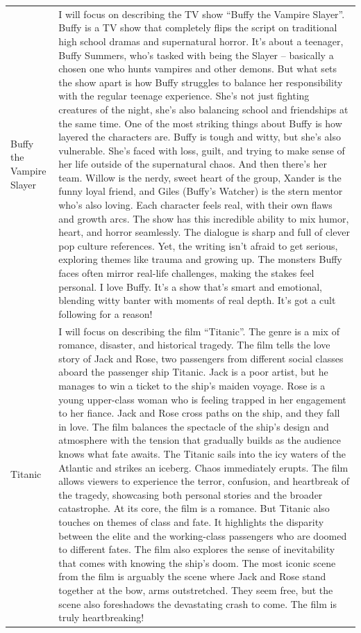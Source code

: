 \documentclass[
  man,
  floatsintext,
  longtable,
  nolmodern,
  notxfonts,
  notimes,
  colorlinks=true,linkcolor=blue,citecolor=blue,urlcolor=blue]{apa7}
\begin{document}
\begin{supptbl}[H]
\begin{minipage}{\linewidth}
\begin{tabular}{>{\raggedright\arraybackslash}p{2cm}>{\raggedright\arraybackslash}p{14cm}}
Buffy the Vampire Slayer & I will focus on describing the TV show “Buffy the Vampire Slayer”. Buffy is a TV show that completely flips the script on traditional high school dramas and supernatural horror. It's about a teenager, Buffy Summers, who's tasked with being the Slayer – basically a chosen one who hunts vampires and other demons. But what sets the show apart is how Buffy struggles to balance her responsibility with the regular teenage experience. She's not just fighting creatures of the night, she's also balancing school and friendships at the same time. One of the most striking things about Buffy is how layered the characters are. Buffy is tough and witty, but she's also vulnerable. She's faced with loss, guilt, and trying to make sense of her life outside of the supernatural chaos. And then there's her team. Willow is the nerdy, sweet heart of the group, Xander is the funny loyal friend, and Giles (Buffy's Watcher) is the stern mentor who's also loving. Each character feels real, with their own flaws and growth arcs. The show has this incredible ability to mix humor, heart, and horror seamlessly. The dialogue is sharp and full of clever pop culture references. Yet, the writing isn't afraid to get serious, exploring themes like trauma and growing up. The monsters Buffy faces often mirror real-life challenges, making the stakes feel personal. I love Buffy. It's a show that's smart and emotional, blending witty banter with moments of real depth. It's got a cult following for a reason!\\
Titanic & I will focus on describing the film “Titanic”. The genre is a mix of romance, disaster, and historical tragedy. The film tells the love story of Jack and Rose, two passengers from different social classes aboard the passenger ship Titanic. Jack is a poor artist, but he manages to win a ticket to the ship's maiden voyage. Rose is a young upper-class woman who is feeling trapped in her engagement to her fiance. Jack and Rose cross paths on the ship, and they fall in love. The film balances the spectacle of the ship's design and atmosphere with the tension that gradually builds as the audience knows what fate awaits. The Titanic sails into the icy waters of the Atlantic and strikes an iceberg. Chaos immediately erupts. The film allows viewers to experience the terror, confusion, and heartbreak of the tragedy, showcasing both personal stories and the broader catastrophe. At its core, the film is a romance. But Titanic also touches on themes of class and fate. It highlights the disparity between the elite and the working-class passengers who are doomed to different fates. The film also explores the sense of inevitability that comes with knowing the ship's doom. The most iconic scene from the film is arguably the scene where Jack and Rose stand together at the bow, arms outstretched. They seem free, but the scene also foreshadows the devastating crash to come. The film is truly heartbreaking!\\
\bottomrule
\end{tabular}
\endgroup{}
\endgroup


\end{minipage}
\end{supptbl}
\end{document}
